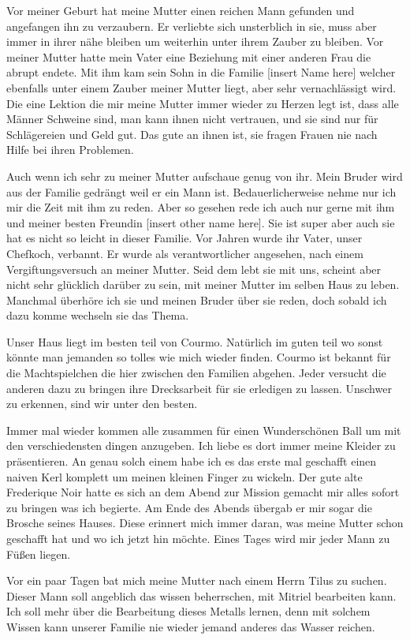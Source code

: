 Vor meiner Geburt hat meine Mutter einen reichen Mann gefunden und angefangen ihn zu verzaubern. Er verliebte sich unsterblich in sie, muss aber immer in ihrer nähe bleiben um weiterhin unter ihrem Zauber zu bleiben. Vor meiner Mutter hatte mein Vater eine Beziehung mit einer anderen Frau die abrupt endete. Mit ihm kam sein Sohn in die Familie [insert Name here] welcher ebenfalls unter einem Zauber meiner Mutter liegt, aber sehr vernachlässigt wird. Die eine Lektion die mir meine Mutter immer wieder zu Herzen legt ist, dass alle Männer Schweine sind, man kann ihnen nicht vertrauen, und sie sind nur für Schlägereien und Geld gut. Das gute an ihnen ist, sie fragen Frauen nie nach Hilfe bei ihren Problemen. 

Auch wenn ich sehr zu meiner Mutter aufschaue genug von ihr. Mein Bruder wird aus der Familie gedrängt weil er ein Mann ist. Bedauerlicherweise nehme nur ich mir die Zeit mit ihm zu reden. Aber so gesehen rede ich auch nur gerne mit ihm und meiner besten Freundin [insert other name here]. Sie ist super aber auch sie hat es nicht so leicht in dieser Familie. Vor Jahren wurde ihr Vater, unser Chefkoch, verbannt. Er wurde als verantwortlicher angesehen, nach einem Vergiftungsversuch an meiner Mutter. Seid dem lebt sie mit uns, scheint aber nicht sehr glücklich darüber zu sein, mit meiner Mutter im selben Haus zu leben. Manchmal überhöre ich sie und meinen Bruder über sie reden, doch sobald ich dazu komme wechseln sie das Thema. 

Unser Haus liegt im besten teil von Courmo. Natürlich im guten teil wo sonst könnte man jemanden so tolles wie mich wieder finden. Courmo ist bekannt für die Machtspielchen die hier zwischen den Familien abgehen. Jeder versucht die anderen dazu zu bringen ihre Drecksarbeit für sie erledigen zu lassen. Unschwer zu erkennen, sind wir unter den besten. 

Immer mal wieder kommen alle zusammen für einen Wunderschönen Ball um mit den verschiedensten dingen anzugeben. Ich liebe es dort immer meine Kleider zu präsentieren. An genau solch einem habe ich es das erste mal geschafft einen naiven Kerl komplett um meinen kleinen Finger zu wickeln. Der gute alte Frederique Noir hatte es sich an dem Abend zur Mission gemacht mir alles sofort zu bringen was ich begierte. Am Ende des Abends übergab er mir sogar die Brosche seines Hauses. Diese erinnert mich immer daran, was meine Mutter schon geschafft hat und wo ich jetzt hin möchte. Eines Tages wird mir jeder Mann zu Füßen liegen.

Vor ein paar Tagen bat mich meine Mutter nach einem Herrn Tilus zu suchen. Dieser Mann soll angeblich das wissen beherrschen, mit Mitriel bearbeiten kann. Ich soll mehr über die Bearbeitung dieses Metalls lernen, denn mit solchem Wissen kann unserer Familie nie wieder jemand anderes das Wasser reichen. 